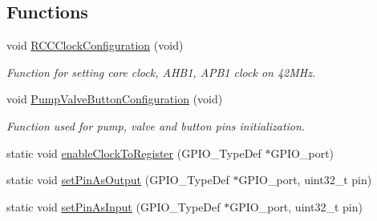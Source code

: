 \subsection*{Functions}
\begin{DoxyCompactItemize}
\item 
void \mbox{\hyperlink{group___blood_pressure_meter_functions_ga3a2706feaeba456e1fc2bb14be91fd22_ga3a2706feaeba456e1fc2bb14be91fd22}{R\+C\+C\+Clock\+Configuration}} (void)
\begin{DoxyCompactList}\small\item\em Function for setting core clock, A\+H\+B1, A\+P\+B1 clock on 42M\+Hz. \end{DoxyCompactList}\item 
void \mbox{\hyperlink{group___blood_pressure_meter_functions_ga24734fd14f8f6338455dc6876c088dd1_ga24734fd14f8f6338455dc6876c088dd1}{Pump\+Valve\+Button\+Configuration}} (void)
\begin{DoxyCompactList}\small\item\em Function used for pump, valve and button pins initialization. \end{DoxyCompactList}\item 
static void \mbox{\hyperlink{group___blood_pressure_meter_functions_ga3c470c357442c6697f971a72790975e8_ga3c470c357442c6697f971a72790975e8}{enable\+Clock\+To\+Register}} (G\+P\+I\+O\+\_\+\+Type\+Def $\ast$G\+P\+I\+O\+\_\+port)
\item 
static void \mbox{\hyperlink{group___blood_pressure_meter_functions_gad4759d75709e2b5bb8d5173a3907a3e6_gad4759d75709e2b5bb8d5173a3907a3e6}{set\+Pin\+As\+Output}} (G\+P\+I\+O\+\_\+\+Type\+Def $\ast$G\+P\+I\+O\+\_\+port, uint32\+\_\+t pin)
\item 
static void \mbox{\hyperlink{group___blood_pressure_meter_functions_gab108244597f329a2bc329694c6fa08e4_gab108244597f329a2bc329694c6fa08e4}{set\+Pin\+As\+Input}} (G\+P\+I\+O\+\_\+\+Type\+Def $\ast$G\+P\+I\+O\+\_\+port, uint32\+\_\+t pin)
\end{DoxyCompactItemize}
